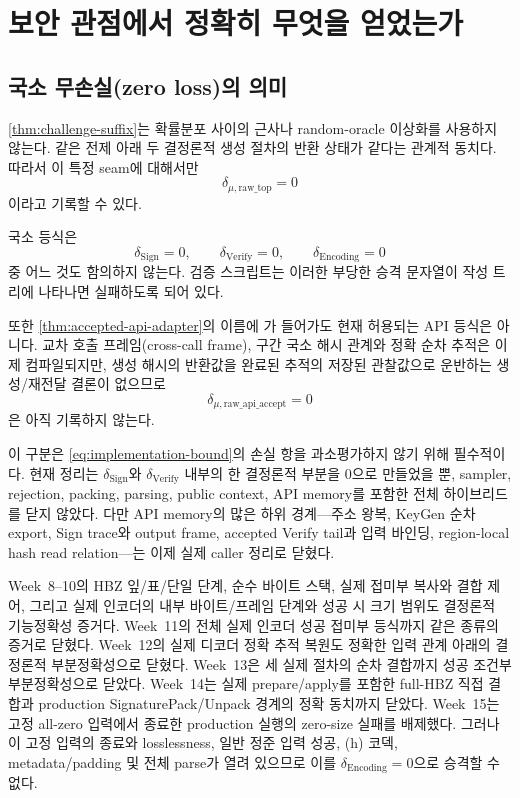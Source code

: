 \section{보안 관점에서 정확히 무엇을 얻었는가}
\label{sec:security-boundary}

\subsection{국소 무손실(zero loss)의 의미}

\cref{thm:challenge-suffix}는 확률분포 사이의 근사나 random-oracle 이상화를
사용하지 않는다. 같은 전제 아래 두 결정론적 생성 절차의 반환 상태가 같다는
관계적 동치다. 따라서 이 특정 seam에 대해서만
\[
  \delta_{\mu,\mathrm{raw\_top}}=0
\]
이라고 기록할 수 있다.

\begin{boundary}[승격할 수 없는 등식]
\label{bdry:no-promotion}
국소 등식은
\[
  \delta_{\mathrm{Sign}}=0,
  \qquad
  \delta_{\mathrm{Verify}}=0,
  \qquad
  \delta_{\mathrm{Encoding}}=0
\]
중 어느 것도 함의하지 않는다. 검증 스크립트는 이러한 부당한 승격 문자열이
작성 트리에 나타나면 실패하도록 되어 있다.
\end{boundary}

또한 \cref{thm:accepted-api-adapter}의 이름에 가 들어가도
현재 허용되는 API 등식은 아니다. 교차 호출 프레임(cross-call frame), 구간
국소 해시 관계와 정확 순차 추적은 이제 컴파일되지만, 생성 해시의 반환값을
완료된 추적의 저장된 관찰값으로 운반하는 생성/재전달 결론이 없으므로
\[
  \delta_{\mu,\mathrm{raw\_api\_accept}}=0
\]
은 아직 기록하지 않는다.

이 구분은 \cref{eq:implementation-bound}의 손실 항을 과소평가하지 않기 위해
필수적이다. 현재 정리는 \(\delta_{\mathrm{Sign}}\)와
\(\delta_{\mathrm{Verify}}\) 내부의 한 결정론적 부분을 0으로 만들었을 뿐,
sampler, rejection, packing, parsing, public context, API memory를 포함한 전체
하이브리드를 닫지 않았다. 다만 API memory의 많은 하위 경계---주소 왕복,
KeyGen 순차 export, Sign trace와 output frame, accepted Verify tail과 입력
바인딩, region-local hash read relation---는 이제 실제 caller 정리로 닫혔다.

Week~8--10의 HBZ 잎/표/단일 단계, 순수 바이트 스택, 실제 접미부 복사와 결합
제어, 그리고 실제 인코더의 내부 바이트/프레임 단계와 성공 시 크기 범위도
결정론적 기능정확성 증거다. Week~11의 전체 실제 인코더 성공 접미부 등식까지
같은 종류의 증거로 닫혔다. Week~12의 실제 디코더 정확 추적 복원도
정확한 입력 관계 아래의 결정론적 부분정확성으로 닫혔다. Week~13은 세 실제
절차의 순차 결합까지 성공 조건부 부분정확성으로 닫았다. Week~14는 실제
prepare/apply를 포함한 full-HBZ 직접 결합과 production SignaturePack/Unpack
경계의 정확 동치까지 닫았다. Week~15는 고정 all-zero 입력에서 종료한
production 실행의 zero-size 실패를 배제했다. 그러나 이 고정 입력의 종료와
losslessness, 일반 정준 입력 성공, (h) 코덱, metadata/padding 및 전체 parse가
열려 있으므로 이를 \(\delta_{\mathrm{Encoding}}=0\)으로 승격할 수 없다.

